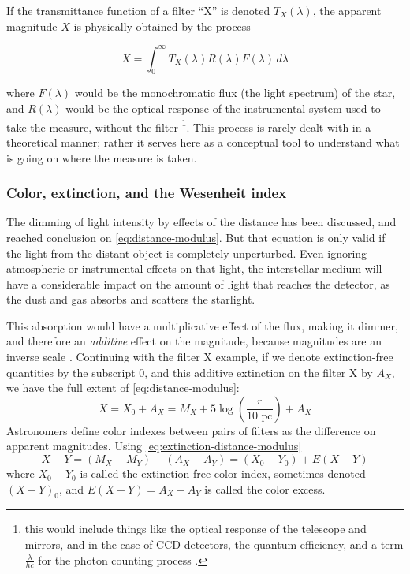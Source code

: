 	If the transmittance function of a filter \enquote{X} is denoted $T_X(\lambda)$, the apparent magnitude $X$ is physically obtained by the process
	
	\begin{equation}
		X = \int_0^\infty T_X(\lambda) R(\lambda) F(\lambda) \,d\lambda
	\end{equation}
	
	where $F(\lambda)$ would be the monochromatic flux (the light spectrum) of the star, 
	and $R(\lambda)$ would be the optical response of the instrumental system used to take the measure, without the filter
	\footnote{this would include things like the optical response of the telescope and mirrors, 
	and in the case of CCD detectors, the quantum efficiency, and a term $\frac{\lambda}{hc}$ for the photon counting process \citep{Bessell2005}.}.
	This process is rarely dealt with in a theoretical manner; 
	rather it serves here as a conceptual tool to understand what is going on where the measure is taken.
	
	\subsubsection{Color, extinction, and the Wesenheit index}
	
	The dimming of light intensity by effects of the distance has been discussed, and reached conclusion on \autoref{eq:distance-modulus}.
	But that equation is only valid if the light from the distant object is completely unperturbed.
	Even ignoring atmospheric or instrumental effects on that light, 
	the interstellar medium will have a considerable impact on the amount of light that reaches the detector,
	as the dust and gas absorbs and scatters the starlight. 
	
	This absorption would have a multiplicative effect of the flux, making it dimmer, 
	and therefore an \textit{additive} effect on the magnitude, because magnitudes are an inverse scale \citep{Karttunen2017}.
	Continuing with the filter X example, if we denote extinction-free quantities by the subscript 0, 
	and this additive extinction on the filter X by $A_X$, we have the full extent of \autoref{eq:distance-modulus}:
	\begin{equation}
		X = X_0 + A_X = M_X + 5 \log\left(\frac{r}{10 \text{ pc}}\right) + A_X \label{eq:extinction-distance-modulus}
	\end{equation}
	Astronomers define color indexes between pairs of filters as the difference on apparent magnitudes. Using \autoref{eq:extinction-distance-modulus}
	\begin{equation}
		X - Y = (M_X - M_Y) + (A_X - A_Y) = (X_0 - Y_0 )+ E(X-Y) \label{eq:color-index}
	\end{equation}
	where $X_0-Y_0$ is called the extinction-free color index, sometimes denoted $(X-Y)_0$,
	and $E(X-Y) = A_X - A_Y$ is called the color excess. 
	
